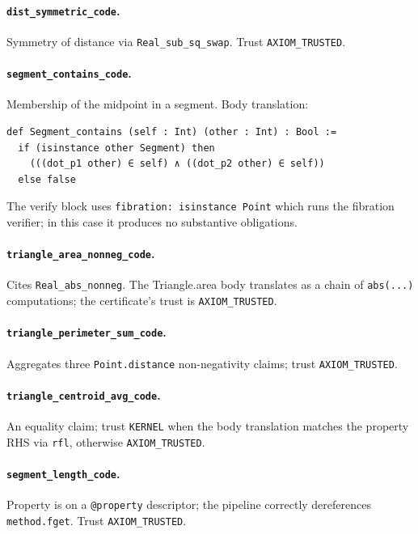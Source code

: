 \paragraph{\texttt{dist\_symmetric\_code}.}  Symmetry of distance
via \texttt{Real\_sub\_sq\_swap}.  Trust \texttt{AXIOM\_TRUSTED}.

\paragraph{\texttt{segment\_contains\_code}.}  Membership of the
midpoint in a segment.  Body translation:
\begin{lstlisting}[language=lean4]
def Segment_contains (self : Int) (other : Int) : Bool :=
  if (isinstance other Segment) then
    (((dot_p1 other) ∈ self) ∧ ((dot_p2 other) ∈ self))
  else false
\end{lstlisting}
The verify block uses \texttt{fibration: isinstance Point} which
runs the fibration verifier; in this case it produces no
substantive obligations.

\paragraph{\texttt{triangle\_area\_nonneg\_code}.}  Cites
\texttt{Real\_abs\_nonneg}.  The Triangle.area body translates as a
chain of \texttt{abs(...)} computations; the certificate's
trust is \texttt{AXIOM\_TRUSTED}.

\paragraph{\texttt{triangle\_perimeter\_sum\_code}.}  Aggregates
three \texttt{Point.distance} non-negativity claims; trust
\texttt{AXIOM\_TRUSTED}.

\paragraph{\texttt{triangle\_centroid\_avg\_code}.}  An equality
claim; trust \texttt{KERNEL} when the body translation matches
the property RHS via \texttt{rfl}, otherwise \texttt{AXIOM\_TRUSTED}.

\paragraph{\texttt{segment\_length\_code}.}  Property is on a
\texttt{@property} descriptor; the pipeline correctly dereferences
\texttt{method.fget}.  Trust \texttt{AXIOM\_TRUSTED}.

